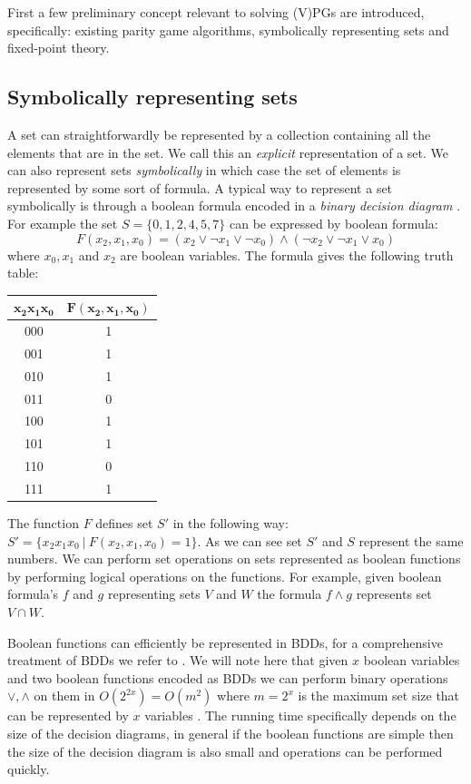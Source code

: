 First a few preliminary concept relevant to solving (V)PGs are introduced, specifically: existing parity game algorithms, symbolically representing sets and fixed-point theory.
\subsection{Symbolically representing sets}
A set can straightforwardly be represented by a collection containing all the elements that are in the set. We call this an \textit{explicit} representation of a set. We can also represent sets \textit{symbolically} in which case the set of elements is represented by some sort of formula. A typical way to represent a set symbolically is through a boolean formula encoded in a \textit{binary decision diagram} \cite{BDD_book,Handbook_BDD_Chapter}. For example the set $S = \{0,1,2,4,5,7 \}$ can be expressed by boolean formula:
\[ F(x_2,x_1,x_0) = (x_2 \vee \neg x_1 \vee \neg x_0) \wedge (\neg x_2 \vee \neg x_1 \vee x_0) \]
where $x_0,x_1$ and $x_2$ are boolean variables. The formula gives the following truth table:\\
\begin{center}
	\begin{tabular}{|c|c|}
		\hline 
		$\mathbf{x_2x_1x_0}$ & $\mathbf{F(x_2,x_1,x_0)}$ \\ 
		\hline 
		000 & 1 \\ 
		\hline 
		001 & 1 \\ 
		\hline 
		010 & 1 \\ 
		\hline 
		011 & 0 \\ 
		\hline 
		100 & 1 \\ 
		\hline 
		101 & 1 \\ 
		\hline 
		110 & 0 \\ 
		\hline 
		111 & 1 \\ 
		\hline 
	\end{tabular} 
\end{center}
The function $F$ defines set $S'$ in the following way: $S' = \{x_2x_1x_0\ |\ F(x_2,x_1,x_0) = 1 \}$. As we can see set $S'$ and $S$ represent the same numbers. We can perform set operations on sets represented as boolean functions by performing logical operations on the functions. For example, given boolean formula's $f$ and $g$ representing sets $V$ and $W$ the formula $f \wedge g$ represents set $V \cap W$.

Boolean functions can efficiently be represented in BDDs, for a comprehensive treatment of BDDs we refer to \cite{BDD_book,Handbook_BDD_Chapter}. We will note here that given $x$ boolean variables and two boolean functions encoded as BDDs we can perform binary operations $\vee,\wedge$ on them in $O(2^{2x})=O(m^2)$ where $m = 2^x$ is the maximum set size that can be represented by $x$ variables \cite{BDD_running_time,Handbook_BDD_Chapter}. The running time specifically depends on the size of the decision diagrams, in general if the boolean functions are simple then the size of the decision diagram is also small and operations can be performed quickly.

